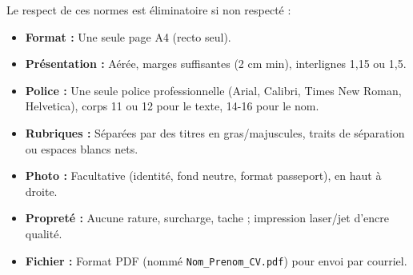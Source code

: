 \documentclass[11pt]{article}
\begin{document}
\begin{propriete}
Le respect de ces normes est éliminatoire si non respecté :
\begin{itemize}
\item \textbf{Format :} Une seule page A4 (recto seul).
\item \textbf{Présentation :} Aérée, marges suffisantes (2 cm min), interlignes 1,15 ou 1,5.
\item \textbf{Police :} Une seule police professionnelle (Arial, Calibri, Times New Roman, Helvetica), corps 11 ou 12 pour le texte, 14-16 pour le nom.
\item \textbf{Rubriques :} Séparées par des titres en gras/majuscules, traits de séparation ou espaces blancs nets.
\item \textbf{Photo :} Facultative (identité, fond neutre, format passeport), en haut à droite.
\item \textbf{Propreté :} Aucune rature, surcharge, tache ; impression laser/jet d'encre qualité.
\item \textbf{Fichier :} Format PDF (nommé \texttt{Nom\_Prenom\_CV.pdf}) pour envoi par courriel.
\end{itemize}
\end{propriete}
\end{document}
